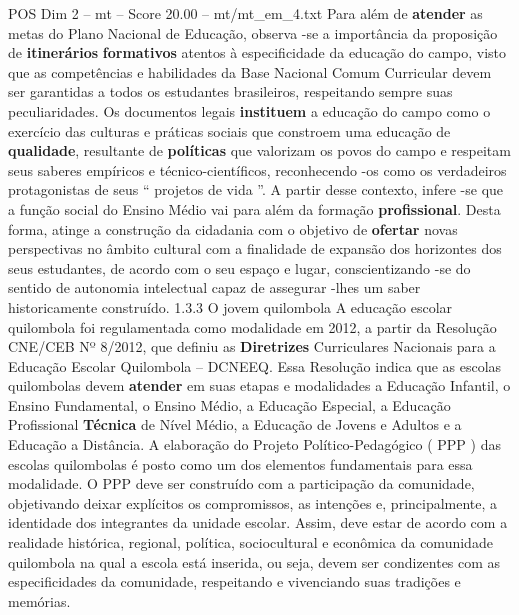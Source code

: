\begin{textsample}{POS Dim 2 – mt – Score 20.00 – mt/mt\_em\_4.txt}
Para além de \textbf{atender} as metas do Plano Nacional de Educação, observa -se a importância da proposição de \textbf{itinerários} \textbf{formativos} atentos à especificidade da educação do campo, visto que as competências e habilidades da Base Nacional Comum Curricular devem ser garantidas a todos os estudantes brasileiros, respeitando sempre suas peculiaridades.
Os documentos legais \textbf{instituem} a educação do campo como o exercício das culturas e práticas sociais que constroem uma educação de \textbf{qualidade}, resultante de \textbf{políticas} que valorizam os povos do campo e respeitam seus saberes empíricos e técnico-científicos, reconhecendo -os como os verdadeiros protagonistas de seus “ projetos de vida ”.
A partir desse contexto, infere -se que a função social do Ensino Médio vai para além da formação \textbf{profissional}.
Desta forma, atinge a construção da cidadania com o objetivo de \textbf{ofertar} novas perspectivas no âmbito cultural com a finalidade de expansão dos horizontes dos seus estudantes, de acordo com o seu espaço e lugar, conscientizando -se do sentido de autonomia intelectual capaz de assegurar -lhes um saber historicamente construído. 1.3.3 O jovem quilombola A educação escolar quilombola foi regulamentada como modalidade em 2012, a partir da Resolução CNE/CEB Nº 8/2012, que definiu as \textbf{Diretrizes} Curriculares Nacionais para a Educação Escolar Quilombola – DCNEEQ.
Essa Resolução indica que as escolas quilombolas devem \textbf{atender} em suas etapas e modalidades a Educação Infantil, o Ensino Fundamental, o Ensino Médio, a Educação Especial, a Educação Profissional \textbf{Técnica} de Nível Médio, a Educação de Jovens e Adultos e a Educação a Distância.
A elaboração do Projeto Político-Pedagógico ( PPP ) das escolas quilombolas é posto como um dos elementos fundamentais para essa modalidade.
O PPP deve ser construído com a participação da comunidade, objetivando deixar explícitos os compromissos, as intenções e, principalmente, a identidade dos integrantes da unidade escolar.
Assim, deve estar de acordo com a realidade histórica, regional, política, sociocultural e econômica da comunidade quilombola na qual a escola está inserida, ou seja, devem ser condizentes com as especificidades da comunidade, respeitando e vivenciando suas tradições e memórias.

\end{textsample}
